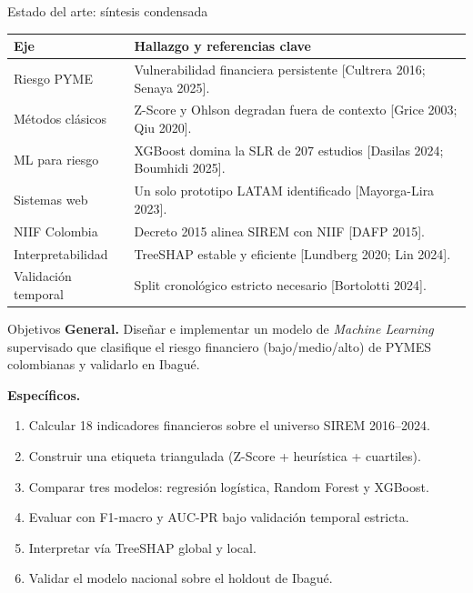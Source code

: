 \documentclass[10pt, aspectratio=169, xcolor=dvipsnames]{beamer}
\newcommand{\zaltscore}{Z\textquotesingle\textquotesingle-Score}
\begin{document}
\begin{frame}{Estado del arte: s\'intesis condensada}
\small
\begin{tabular}{@{}p{3.2cm} p{8.6cm}@{}}
\toprule
\textbf{Eje} & \textbf{Hallazgo y referencias clave} \\
\midrule
Riesgo PYME           & Vulnerabilidad financiera persistente [Cultrera 2016; Senaya 2025]. \\
M\'etodos cl\'asicos  & Z-Score y Ohlson degradan fuera de contexto [Grice 2003; Qiu 2020]. \\
ML para riesgo        & XGBoost domina la SLR de 207 estudios [Dasilas 2024; Boumhidi 2025]. \\
Sistemas web          & Un solo prototipo LATAM identificado [Mayorga-Lira 2023]. \\
NIIF Colombia         & Decreto 2015 alinea SIREM con NIIF [DAFP 2015]. \\
Interpretabilidad     & TreeSHAP estable y eficiente [Lundberg 2020; Lin 2024]. \\
Validaci\'on temporal & Split cronol\'ogico estricto necesario [Bortolotti 2024]. \\
\bottomrule
\end{tabular}
\end{frame}

\begin{frame}{Objetivos}
\textbf{General.} Dise\~nar e implementar un modelo de \emph{Machine Learning} supervisado que clasifique el riesgo financiero (bajo/medio/alto) de PYMES colombianas y validarlo en Ibagu\'e.

\medskip
\textbf{Espec\'ificos.}
\begin{enumerate}
  \item Calcular 18 indicadores financieros sobre el universo SIREM 2016--2024.
  \item Construir una etiqueta triangulada (\zaltscore{} + heur\'istica + cuartiles).
  \item Comparar tres modelos: regresi\'on log\'istica, Random Forest y XGBoost.
  \item Evaluar con F1-macro y AUC-PR bajo validaci\'on temporal estricta.
  \item Interpretar v\'ia TreeSHAP global y local.
  \item Validar el modelo nacional sobre el holdout de Ibagu\'e.
\end{enumerate}
\end{frame}
\end{document}
